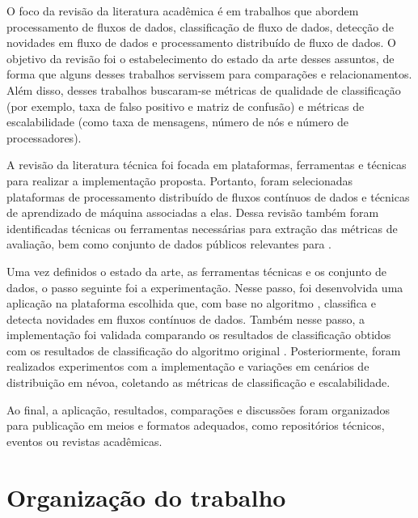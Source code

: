 O foco da revisão da literatura acadêmica é em trabalhos que abordem
processamento de fluxos de dados, classificação de fluxo de dados, detecção de
novidades em fluxo de dados e processamento distribuído de fluxo de dados.
O objetivo da revisão foi o estabelecimento do estado da arte desses assuntos,
de forma que alguns desses trabalhos servissem para comparações e relacionamentos.
Além disso, desses trabalhos buscaram-se métricas de qualidade de classificação
(por exemplo, taxa de falso positivo e matriz de confusão) e métricas de
escalabilidade (como taxa de mensagens, número de nós e número de processadores).

A revisão da literatura técnica foi focada em plataformas, ferramentas e técnicas
para realizar a implementação proposta.
Portanto, foram selecionadas plataformas de processamento distribuído de fluxos
contínuos de dados
e técnicas de aprendizado de máquina associadas a elas.
Dessa revisão também foram identificadas técnicas ou ferramentas necessárias
para extração das métricas de avaliação, bem como conjunto de dados
públicos relevantes para \nids.

Uma vez definidos o estado da arte, as ferramentas técnicas e os
conjunto de dados, o passo seguinte foi a experimentação.
Nesse passo, foi desenvolvida uma aplicação na plataforma escolhida que, com base no
algoritmo \minas \cite{Faria2016minas}, classifica e detecta novidades em fluxos
contínuos de dados.
Também nesse passo, a implementação foi validada comparando os resultados de
classificação obtidos com os resultados de classificação do algoritmo original
\minas.
Posteriormente, foram realizados experimentos com a implementação e variações em
cenários de distribuição em névoa, coletando as métricas de classificação e
escalabilidade.

Ao final, a aplicação, resultados, comparações e discussões foram organizados
para publicação em meios e formatos adequados, como repositórios técnicos,
eventos ou revistas acadêmicas.

\section{Organização do trabalho}


